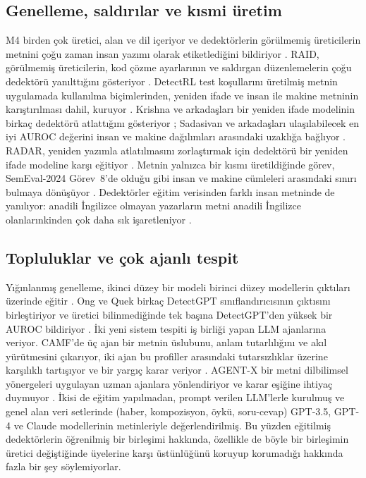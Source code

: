 \documentclass[journal]{IEEEtran}
\begin{document}
\subsection{Genelleme, saldırılar ve kısmi üretim}
M4 birden çok üretici, alan ve dil içeriyor ve dedektörlerin görülmemiş üreticilerin metnini çoğu zaman insan yazımı
olarak etiketlediğini bildiriyor \cite{Wang_2024}. RAID, görülmemiş üreticilerin, kod çözme ayarlarının ve saldırgan
düzenlemelerin çoğu dedektörü yanılttığını gösteriyor \cite{Dugan_2024}. DetectRL test koşullarını üretilmiş metnin
uygulamada kullanılma biçimlerinden, yeniden ifade ve insan ile makine metninin karıştırılması dahil, kuruyor
\cite{Wu_2024}. Krishna ve arkadaşları bir yeniden ifade modelinin birkaç dedektörü atlattığını gösteriyor
\cite{Krishna_2023}; Sadasivan ve arkadaşları ulaşılabilecek en iyi AUROC değerini insan ve makine dağılımları
arasındaki uzaklığa bağlıyor \cite{Sadasivan_2023}. RADAR, yeniden yazımla atlatılmasını zorlaştırmak için dedektörü
bir yeniden ifade modeline karşı eğitiyor \cite{Hu_2023}. Metnin yalnızca bir kısmı üretildiğinde görev,
SemEval-2024 Görev~8'de olduğu gibi insan ve makine cümleleri arasındaki sınırı bulmaya dönüşüyor
\cite{Wang_SemEval_2024,Qu_2024}. Dedektörler eğitim verisinden farklı insan metninde de yanılıyor: anadili
İngilizce olmayan yazarların metni anadili İngilizce olanlarınkinden çok daha sık işaretleniyor \cite{Liang_2023}.

\subsection{Topluluklar ve çok ajanlı tespit}
Yığınlanmış genelleme, ikinci düzey bir modeli birinci düzey modellerin çıktıları üzerinde eğitir
\cite{Wolpert_1992}. Ong ve Quek birkaç DetectGPT sınıflandırıcısının çıktısını birleştiriyor ve üretici
bilinmediğinde tek başına DetectGPT'den yüksek bir AUROC bildiriyor \cite{Ong_2024}. İki yeni sistem tespiti iş
birliği yapan LLM ajanlarına veriyor. CAMF'de üç ajan bir metnin üslubunu, anlam tutarlılığını ve akıl yürütmesini
çıkarıyor, iki ajan bu profiller arasındaki tutarsızlıklar üzerine karşılıklı tartışıyor ve bir yargıç karar
veriyor \cite{Wang_CAMF_2025}. AGENT-X bir metni dilbilimsel yönergeleri uygulayan uzman ajanlara yönlendiriyor ve
karar eşiğine ihtiyaç duymuyor \cite{Li_AgentX_2025}. İkisi de eğitim yapılmadan, prompt verilen LLM'lerle kurulmuş
ve genel alan veri setlerinde (haber, kompozisyon, öykü, soru-cevap) GPT-3.5, GPT-4 ve Claude modellerinin
metinleriyle değerlendirilmiş. Bu yüzden eğitilmiş dedektörlerin öğrenilmiş bir birleşimi hakkında, özellikle de
böyle bir birleşimin üretici değiştiğinde üyelerine karşı üstünlüğünü koruyup korumadığı hakkında fazla bir şey
söylemiyorlar.
\end{document}

